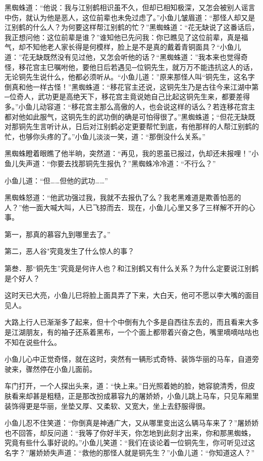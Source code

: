 \documentclass[12pt,oneside]{book}
\begin{document}
黑蜘蛛道：``他说：我与江别鹤相识虽不久，但却已相知极深，又怎会被别人谣言中伤，就认为他是恶人，这位前辈也未免过虑了。''小鱼儿皱眉道：``那怪人却又是江别鹤的什么人？为何要这样帮江别鹤的忙？''黑蜘蛛道：``花无缺说了这番话后，我正想问他：这位前辈是谁？''谁知他已先问我：你已瞧见了这位前辈，真是福气，却不知他老人家长得是何模样，脸上是不是真的戴着青铜面具？``小鱼儿道：''花无缺既然没有见过他，又怎会听他的话？``黑蜘蛛道：''我本来也觉得奇怪，移花宫主巳嘱咐他，要他日后若遇见─位铜先生，就万万不能违抗这人的话，无论铜先生说什么，他都必须听从。``小鱼儿道：''原来那怪人叫``铜先生，这名字倒真和他一样古怪！''黑蜘蛛道：``移花官主还说，这铜先生乃是古往今来江湖中第─位奇人，武功更是高绝天下，移花宫主竟说她自己比起这铜先生来，都要差得多。''小鱼儿动容道：``移花宫主那么高傲的人，也会说这样的话么？若连移花宫主都对他如此服气，这铜先生的武功倒的确是可怕得很了。''黑蜘蛛道；``但花无缺既对那铜先生言听计从，日后对江别鹤必定更要帮忙到底，有他那样的人帮江别鹤的忙，也够你头疼的了。''小鱼儿淡淡一笑，道：``那倒没什么关系。''

黑蜘蛛瞪着眼瞧了他半晌，突然道：``再见，我的恩虽已报过，仇却还未报哩！''小鱼儿失声道：``你要去找那铜先生报仇？''黑蜘蛛冷冷道：``不行么？''

小鱼儿道：``但\ldots\ldots 但他的武功\ldots\ldots{}''

黑蜘蛛怒道：``他武功强过我，我就不去报仇了么？我老黑难道是欺善怕恶的人？''他一面大喊大叫，人已飞掠而去．现在，小鱼儿心里又多了三样解不开的心事。

第一，那真的慕容九到哪里去了。''

第二，恶人谷"究竟发生了什么惊人的事？

第叁．那``铜先生''究竟是何许人也？和江别鹤又有什么关系？为什么定要说江别鹤是个好人？

这时天已大亮，小鱼儿巳将脸上面具弄了下来，大白天，他可不愿以李大嘴的面目见人。

大路上行人已渐渐多了起来，但十个中倒有九个多是自西往东去的，而且看来大多是江湖朋友，有的袖子还系着黑布，一个个面上都带着兴奋之色，嘴里嘀嘀咕咕也不知在说些什么。

小鱼儿心中正觉奇怪，就在这时，突然有一辆形式奇特、装饰华丽的马车，自道旁驶来，骤然停在小鱼儿面前。

车门打开，一个人探出头来，道：``快上来。''日光照着她的脸，她容貌清秀，但皮肤看来却甚是粗糙，正是那改扮成慕容九的屠娇娇，小鱼儿跳上马车，只见车厢里装饰得更是华丽，坐垫又厚、又柔软、又宽大，坐上去舒服得很。

小鱼儿忍不住笑道：``你倒真是神通广大，又从哪里变出这么辆马车来了？''屠娇娇也不回答，却反问道：``我等了你好半天，你怎地到此刻才出来，你和那黑蜘蛛，究竟有些什么事好说的。''小鱼儿笑道：``我们在谈论着一位铜先生，你可听见过这名字？''屠娇娇失声道：``救他的那怪人就是铜先生？''小鱼儿道：``你知道这人？''
\end{document}
